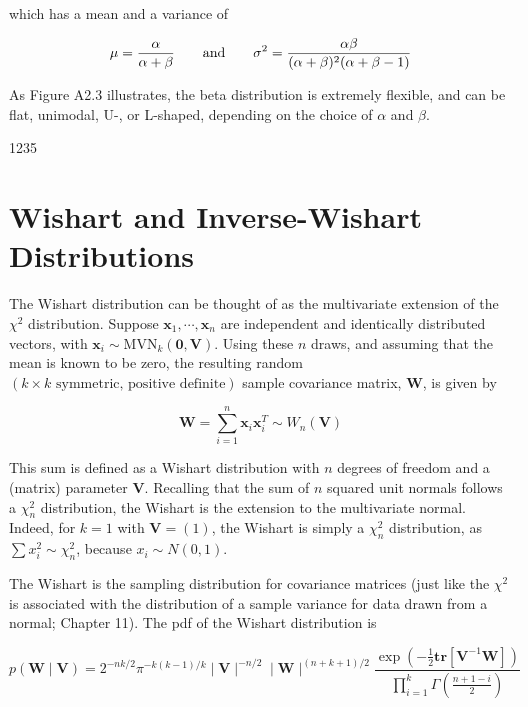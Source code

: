 \documentclass{article}
\begin{document}
which has a mean and a variance of

\begin{equation}
\begin{align*}\mu=\frac{\alpha}{\alpha+\beta}\qquad{\rm and}\qquad\sigma^2=\frac{\alpha\beta}{(\alpha+\beta)^2(\alpha+\beta-1)}\end{align*}
\end{equation}

As Figure A2.3 illustrates, the beta distribution is extremely flexible, and can be flat, unimodal, U-, or L-shaped, depending on the choice of  $ \alpha $ and  $ \beta $.

1235

\section{Wishart and Inverse-Wishart Distributions}
The Wishart distribution can be thought of as the multivariate extension of the  $ \chi^2 $ distribution. Suppose  $ \mathbf{x}_1, \cdots, \mathbf{x}_n $ are independent and identically distributed vectors, with  $ \mathbf{x}_i \sim \text{MVN}_k(\mathbf{0}, \mathbf{V}) $. Using these  $ n $ draws, and assuming that the mean is known to be zero, the resulting random  $ (k \times k \text{ symmetric, positive definite}) $ sample covariance matrix,  $ \mathbf{W} $, is given by

\begin{equation}
\mathbf{W}=\sum_{i=1}^{n}\mathbf{x}_{i}\mathbf{x}_{i}^{T}\sim W_{n}(\mathbf{V})
\end{equation}

This sum is defined as a Wishart distribution with $n$ degrees of freedom and a (matrix) parameter $\mathbf{V}$. Recalling that the sum of $n$ squared unit normals follows a $\chi_n^2$ distribution, the Wishart is the extension to the multivariate normal. Indeed, for $k=1$ with $\mathbf{V}=(1)$, the Wishart is simply a $\chi_n^2$ distribution, as $\sum x_i^2 \sim \chi_n^2$, because $x_i \sim N(0,1)$.

The Wishart is the sampling distribution for covariance matrices (just like the  $ \chi^{2} $ is associated with the distribution of a sample variance for data drawn from a normal; Chapter 11). The pdf of the Wishart distribution is

\begin{equation}
p(\mathbf{W}\mid\mathbf{V})=2^{-n k/2}\pi^{-k(k-1)/k}\mid\mathbf{V}\mid^{-n/2}\mid\mathbf{W}\mid^{(n+k+1)/2}\frac{\exp\left(-\frac{1}{2}\mathbf{t}\mathbf{r}\left[\mathbf{V}^{-1}\mathbf{W}\right]\right)}{\prod_{i=1}^{k}\Gamma\left(\frac{n+1-i}{2}\right)}
\end{equation}
\end{document}
